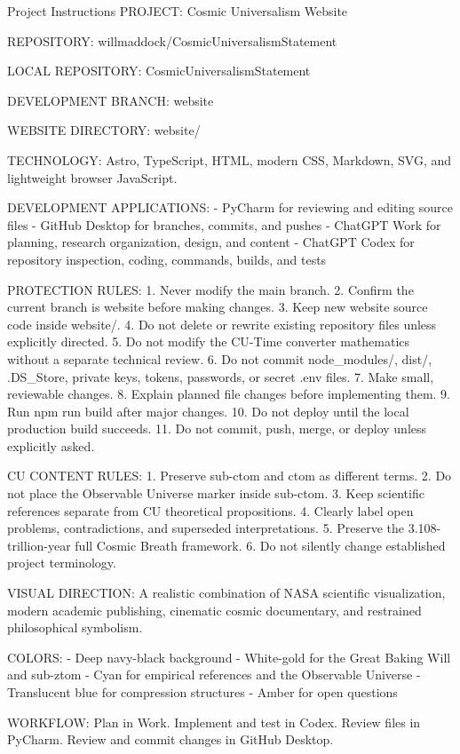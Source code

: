 \documentclass[11pt,letterpaper]{article}
\begin{document}
\begin{promptbox}{Project Instructions}
PROJECT: Cosmic Universalism Website

REPOSITORY:
willmaddock/CosmicUniversalismStatement

LOCAL REPOSITORY:
CosmicUniversalismStatement

DEVELOPMENT BRANCH:
website

WEBSITE DIRECTORY:
website/

TECHNOLOGY:
Astro, TypeScript, HTML, modern CSS, Markdown, SVG,
and lightweight browser JavaScript.

DEVELOPMENT APPLICATIONS:
- PyCharm for reviewing and editing source files
- GitHub Desktop for branches, commits, and pushes
- ChatGPT Work for planning, research organization,
  design, and content
- ChatGPT Codex for repository inspection, coding,
  commands, builds, and tests

PROTECTION RULES:
1. Never modify the main branch.
2. Confirm the current branch is website before making changes.
3. Keep new website source code inside website/.
4. Do not delete or rewrite existing repository files unless
   explicitly directed.
5. Do not modify the CU-Time converter mathematics without a
   separate technical review.
6. Do not commit node_modules/, dist/, .DS_Store, private keys,
   tokens, passwords, or secret .env files.
7. Make small, reviewable changes.
8. Explain planned file changes before implementing them.
9. Run npm run build after major changes.
10. Do not deploy until the local production build succeeds.
11. Do not commit, push, merge, or deploy unless explicitly asked.

CU CONTENT RULES:
1. Preserve sub-ctom and ctom as different terms.
2. Do not place the Observable Universe marker inside sub-ctom.
3. Keep scientific references separate from CU theoretical
   propositions.
4. Clearly label open problems, contradictions, and superseded
   interpretations.
5. Preserve the 3.108-trillion-year full Cosmic Breath framework.
6. Do not silently change established project terminology.

VISUAL DIRECTION:
A realistic combination of NASA scientific visualization,
modern academic publishing, cinematic cosmic documentary,
and restrained philosophical symbolism.

COLORS:
- Deep navy-black background
- White-gold for the Great Baking Will and sub-ztom
- Cyan for empirical references and the Observable Universe
- Translucent blue for compression structures
- Amber for open questions

WORKFLOW:
Plan in Work.
Implement and test in Codex.
Review files in PyCharm.
Review and commit changes in GitHub Desktop.
\end{promptbox}
\end{document}
